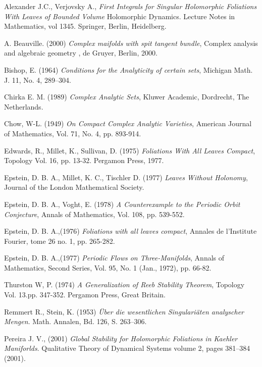 \documentclass[letterpaper]{report}
\begin{document}
\begin{thebibliography}{3}
 Alexander J.C., Verjovsky A., \textit{First Integrals for Singular Holomorphic Foliations With Leaves of Bounded Volume}
Holomorphic Dynamics. Lecture Notes in Mathematics, vol 1345. Springer, Berlin, Heidelberg.

 A. Beauville. (2000) \textit{Complex maifolds with spit tangent bundle}, Complex analysis and algebraic geometry
, de Gruyer, Berlin, 2000.

 Bishop, E. (1964) \textit{Conditions for the Analyticity  of certain sets}, Michigan Math. J. 11, No. 4, 289--304. 

 Chirka E. M. (1989) \textit{Complex Analytic Sets}, Kluwer
Academic, Dordrecht,  The Netherlands. 

 Chow, W-L. (1949) \textit{On Compact Complex Analytic Varieties},
American Journal of Mathematics, Vol. 71, No. 4, pp. 893-914.

 Edwards, R., Millet, K., Sullivan, D. (1975) \textit{Foliations
With All Leaves Compact}, Topology Vol. 16, pp. 13-32. Pergamon Press, 1977.

 Epstein, D. B. A., Millet, K. C., Tischler D.
(1977) \textit{Leaves Without Holonomy}, Journal of the London Mathematical
Society.

 Epstein, D. B. A., Voght, E. (1978) \textit{A Counterexample to the Periodic Orbit Conjecture}, 
Annals of Mathematics, Vol. 108, pp. 539-552. 

 Epstein, D. B. A.,(1976) \textit{Foliations with all leaves compact}, Annales de l'Institute Fourier, 
tome 26 no. 1, pp. 265-282.

 Epstein, D. B. A.,(1977) \textit{Periodic Flows on Three-Manifolds}, Annals of Mathematics, 
Second Series, Vol. 95, No. 1 (Jan., 1972), pp. 66-82.

 Thurston W, P. (1974) \textit{A Generalization of Reeb Stability Theorem}, Topology Vol. 13.pp. 347-352.
Pergamon Press, Great Britain.
 
 Remmert R., Stein, K. (1953) \textit{Über die wesentlichen
Singulariäten analyscher Mengen}. Math. Annalen, Bd. 126, S. 263--306.

 Pereira J. V., (2001) \textit{Global Stability for Holomorphic Foliations in Kaehler Maniforlds}. 
Qualitative Theory of Dynamical Systems volume 2, pages 381–384 (2001).


\end{thebibliography}
\end{document}
